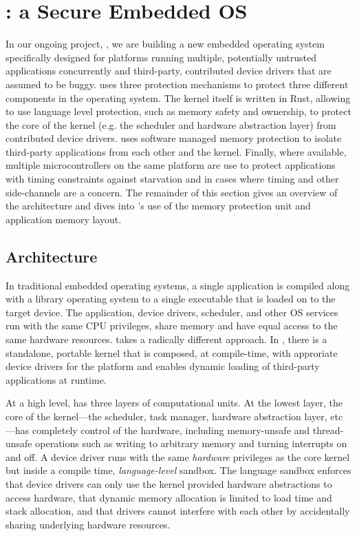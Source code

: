 \section{\name: a Secure Embedded OS}

In our ongoing project, \name, we are building a new embedded operating system
specifically designed for platforms running multiple, potentially untrusted
applications concurrently and third-party, contributed device drivers that are
assumed to be buggy. \name uses three protection mechanisms to protect three
different components in the operating system. The kernel itself is written in
Rust, allowing \name to use language level protection, such as memory safety and
ownership, to protect the core of the kernel (e.g. the scheduler and hardware
abstraction layer) from contributed device drivers. \name uses software managed
memory protection to isolate third-party applications from each other and the
kernel. Finally, where available, multiple microcontrollers on the same platform
are use to protect applications with timing constraints against starvation and
in cases where timing and other side-channels are a concern. The remainder of
this section gives an overview of the \name architecture and dives into \name's
use of the memory protection unit and application memory layout.

\subsection{Architecture}

In traditional embedded operating systems, a single application is
compiled along with a library operating system to a single executable that is
loaded on to the target device. The application, device drivers, scheduler, and
other OS services run with the same CPU privileges, share memory and have equal access
to the same hardware resources. \name takes a radically different approach. In
\name, there is a standalone, portable kernel that is composed, at compile-time,
with approriate device drivers for the platform and enables dynamic loading of
third-party applications at runtime.

At a high level, \name has three layers of computational units. At the lowest
layer, the core of the kernel---the scheduler, task manager, hardware
abstraction layer, etc---has completely control of the hardware, including
memory-unsafe and thread-unsafe operations such as writing to arbitrary memory
and turning interrupts on and off. A device driver runs with the same
\emph{hardware} privileges as the core kernel but inside a compile time,
\emph{language-level} sandbox. The language sandbox enforces that device drivers
can only use the kernel provided hardware abstractions to access hardware, that
dynamic memory allocation is limited to load time and stack allocation, and that
drivers cannot interfere with each other by accidentally sharing underlying
hardware resources.

